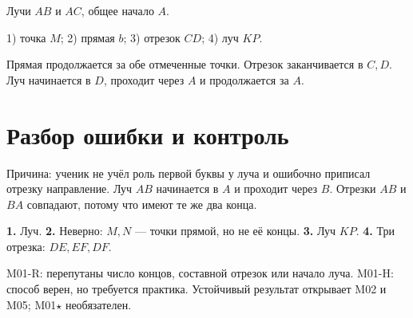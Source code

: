 \oppositeraysfigure

\begin{practicebox}[3. Лучи]
  Лучи $AB$ и $AC$, общее начало $A$.
\end{practicebox}

\clearpage
\identifyobjectsanswersfigure

\begin{practicebox}[4. Названия]
  1) точка $M$; 2) прямая $b$; 3) отрезок $CD$; 4) луч $KP$.
\end{practicebox}

\constructionanswersfigure

\begin{teacherbox}
  Прямая продолжается за обе отмеченные точки. Отрезок заканчивается в $C,D$.
  Луч начинается в $D$, проходит через $A$ и продолжается за $A$.
\end{teacherbox}

\section{Разбор ошибки и контроль}

\begin{warningbox}
  Причина: ученик не учёл роль первой буквы у луча и ошибочно приписал
  отрезку направление. Луч $AB$ начинается в $A$ и проходит через $B$.
  Отрезки $AB$ и $BA$ совпадают, потому что имеют те же два конца.
\end{warningbox}

\begin{checkpointbox}[Ответы]
  \textbf{1.} Луч. \textbf{2.} Неверно: $M,N$ — точки прямой, но не её
  концы. \textbf{3.} Луч $KP$. \textbf{4.} Три отрезка: $DE,EF,DF$.
\end{checkpointbox}

\begin{teacherbox}
  M01-R: перепутаны число концов, составной отрезок или начало луча.
  M01-H: способ верен, но требуется практика. Устойчивый результат открывает
  M02 и M05; M01\(\star\) необязателен.
\end{teacherbox}
